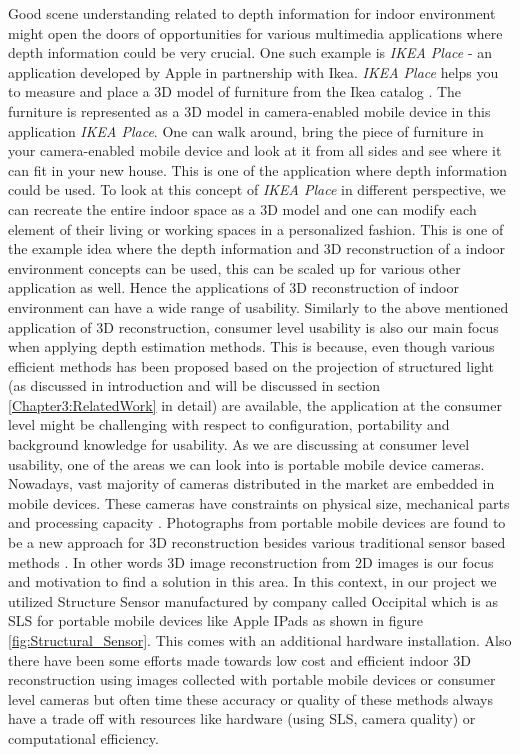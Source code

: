 Good scene understanding related to depth information for indoor environment might open the doors of opportunities for various multimedia applications where depth information could be very crucial. One such example is \textit{IKEA Place} - an application developed by Apple in partnership with Ikea. \textit{IKEA Place} helps you to measure and place a 3D model of furniture from the Ikea catalog \cite{lehnert2017neue}. The furniture is represented as a 3D model in camera-enabled mobile device in this application \textit{IKEA Place}. One can walk around, bring the piece of furniture in your camera-enabled mobile device and look at it from all sides and see where it can fit in your new house. This is one of the application where depth information could be used. To look at this concept of \textit{IKEA Place} in different perspective, we can recreate the entire indoor space as a 3D model and one can modify each element of their living or working spaces in a personalized fashion. This is one of the example idea where the depth information and 3D reconstruction of a indoor environment concepts can be used, this can be scaled up for various other application as well. Hence the applications of 3D reconstruction of indoor environment can have a wide range of usability. Similarly to the above mentioned application of 3D reconstruction, consumer level usability is also our main focus when applying depth estimation methods.  This is because, even though various efficient methods has been proposed based on the projection of structured light (as discussed in introduction and will be discussed in section \ref{Chapter3:RelatedWork} in detail) are available, the application at the consumer level might be challenging with respect to configuration, portability and background knowledge for usability. As we are discussing at consumer level usability, one of the areas we can look into is portable mobile device cameras. Nowadays, vast majority of cameras distributed in the market are embedded in mobile devices. These cameras have constraints on physical size, mechanical parts and processing capacity \cite{lee2007constraints}. Photographs from portable mobile devices are found to be a new approach for 3D reconstruction besides various traditional sensor based methods \cite{micheletti2015investigating, adan20113d}. In other words 3D image reconstruction from 2D images is our focus and motivation to find a solution in this area. In this context, in our project we utilized Structure Sensor manufactured by company called Occipital which is as SLS for portable mobile devices like Apple IPads as shown in figure \ref{fig:Structural_Sensor}. This comes with an additional hardware installation. Also there have been some efforts made towards low cost and efficient indoor 3D reconstruction using images collected with portable mobile devices or consumer level cameras \cite{ding2019low} but often time these accuracy or quality of these methods always have a trade off with resources like hardware (using SLS, camera quality) or computational efficiency.

